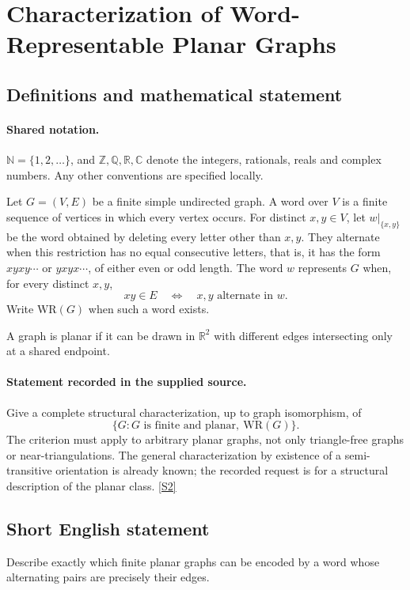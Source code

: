 \documentclass[11pt]{article}
\newcommand{\sref}[2]{\hyperlink{source:#1:#2}{[S#2]}}
\begin{document}
\section{Characterization of Word-Representable Planar Graphs}\label{statement}

\subsection{Definitions and mathematical statement}

\paragraph{Shared notation.}$\mathbb N=\{1,2,\ldots\}$, and $\mathbb Z,\mathbb Q,\mathbb R,\mathbb C$ denote the integers, rationals, reals and complex numbers. Any other conventions are specified locally.


Let $G=(V,E)$ be a finite simple undirected graph. A word over $V$ is a finite sequence of vertices in which every vertex occurs. For distinct $x,y\in V$, let $w|_{\{x,y\}}$ be the word obtained by deleting every letter other than $x,y$. They alternate when this restriction has no equal consecutive letters, that is, it has the form $xyxy\cdots$ or $yxyx\cdots$, of either even or odd length. The word $w$ represents $G$ when, for every distinct $x,y$,
\[
 xy\in E\quad\Longleftrightarrow\quad x,y\text{ alternate in }w.
\]
Write $\mathrm{WR}(G)$ when such a word exists.

A graph is planar if it can be drawn in $\mathbb R^2$ with different edges intersecting only at a shared endpoint.
\paragraph{Statement recorded in the supplied source.}
Give a complete structural characterization, up to graph isomorphism, of
\[
 \{G:G\text{ is finite and planar},\ \mathrm{WR}(G)\}.
\]
The criterion must apply to arbitrary planar graphs, not only triangle-free graphs or near-triangulations. The general characterization by existence of a semi-transitive orientation is already known; the recorded request is for a structural description of the planar class. \sref{statement}{2}
\subsection{Short English statement}
Describe exactly which finite planar graphs can be encoded by a word whose alternating pairs are precisely their edges.
\end{document}

